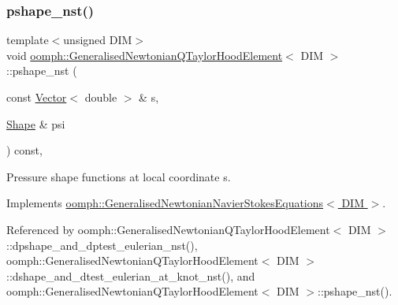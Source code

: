 \subsubsection{\texorpdfstring{pshape\+\_\+nst()}{pshape\_nst()}\hspace{0.1cm}{\footnotesize\ttfamily [1/4]}}
{\footnotesize\ttfamily template$<$unsigned D\+IM$>$ \\
void \hyperlink{classoomph_1_1GeneralisedNewtonianQTaylorHoodElement}{oomph\+::\+Generalised\+Newtonian\+Q\+Taylor\+Hood\+Element}$<$ D\+IM $>$\+::pshape\+\_\+nst (\begin{DoxyParamCaption}\item[{const \hyperlink{classoomph_1_1Vector}{Vector}$<$ double $>$ \&}]{s,  }\item[{\hyperlink{classoomph_1_1Shape}{Shape} \&}]{psi }\end{DoxyParamCaption}) const\hspace{0.3cm}{\ttfamily [inline]}, {\ttfamily [virtual]}}



Pressure shape functions at local coordinate s. 



Implements \hyperlink{classoomph_1_1GeneralisedNewtonianNavierStokesEquations_a84735d21f3d1ade819726a71a7b462e1}{oomph\+::\+Generalised\+Newtonian\+Navier\+Stokes\+Equations$<$ D\+I\+M $>$}.



Referenced by oomph\+::\+Generalised\+Newtonian\+Q\+Taylor\+Hood\+Element$<$ D\+I\+M $>$\+::dpshape\+\_\+and\+\_\+dptest\+\_\+eulerian\+\_\+nst(), oomph\+::\+Generalised\+Newtonian\+Q\+Taylor\+Hood\+Element$<$ D\+I\+M $>$\+::dshape\+\_\+and\+\_\+dtest\+\_\+eulerian\+\_\+at\+\_\+knot\+\_\+nst(), and oomph\+::\+Generalised\+Newtonian\+Q\+Taylor\+Hood\+Element$<$ D\+I\+M $>$\+::pshape\+\_\+nst().

\mbox{\label{classoomph_1_1GeneralisedNewtonianQTaylorHoodElement_a8eaa00a86146a184fc2fae213061f200}} 

